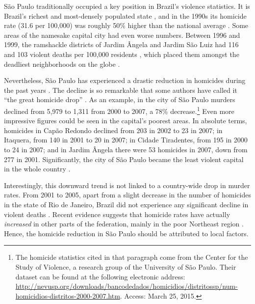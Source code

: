 \documentclass[a4paper,11pt]{article}
\begin{document}
S\~{a}o Paulo traditionally occupied a key position in Brazil's violence statistics. It is Brazil's richest \citep{ibge2012} and most-densely populated state \citep{ibge2014}, and in the 1990s its homicide rate (31.6 per 100,000) was roughly 50\% higher than the national average \citep{barata2000}. Some areas of the namesake capital city had even worse numbers. Between 1996 and 1999, the ramshackle districts of Jardim \^{A}ngela and Jardim S\~{a}o Luiz had 116 and 103 violent deaths per 100,000 residents \citep[8]{cardia2003}, which placed them amongst the deadliest neighborhoods on the globe \citep{who2015}.

Nevertheless, S\~{a}o Paulo has experienced a drastic reduction in homicides during the past years \citep{camargo2007}. The decline is so remarkable that some authors have called it ``the great homicide drop'' \citep{goertzel2009}. As an example, in the city of S\~{a}o Paulo murders declined from 5,979 to 1,311 from 2000 to 2007, a 78\% decrease.\footnote{The homicide statistics cited in that paragraph come from the Center for the Study of Violence, a research group of the University of S\~{a}o Paulo. Their dataset can be found at the following electronic address: \href{http://nevusp.org/downloads/bancodedados/homicidios/distritossp/num-homicidios-distritos-2000-2007.htm}{http://nevusp.org/downloads/bancodedados/homicidios/distritossp/num-homicidios-distritos-2000-2007.htm}. Access: March 25, 2015.} Even more impressive figures could be seen in the capital's poorest areas. In absolute terms, homicides in Cap\~{a}o Redondo declined from 203 in 2002 to 23 in 2007; in Itaquera, from 140 in 2001 to 20 in 2007; in Cidade Tiradentes, from 195 in 2000 to 24 in 2007; and in Jardim \^{A}ngela there were 53 homicides in 2007, down from 277 in 2001. Significantly, the city of S\~{a}o Paulo became the least violent capital in the whole country \citep{mapa2011}.

Interestingly, this downward trend is not linked to a country-wide drop in murder rates. From 2001 to 2005, apart from a slight decrease in the number of homicides in the state of Rio de Janeiro, Brazil did not experience any significant decline in violent deaths \citep{goertzel2009}. Recent evidence suggests that homicide rates have actually \textit{increased} in other parts of the federation, mainly in the poor Northeast region \citep{souza2014}. Hence, the homicide reduction in S\~{a}o Paulo should be attributed to local factors. 
\end{document}

